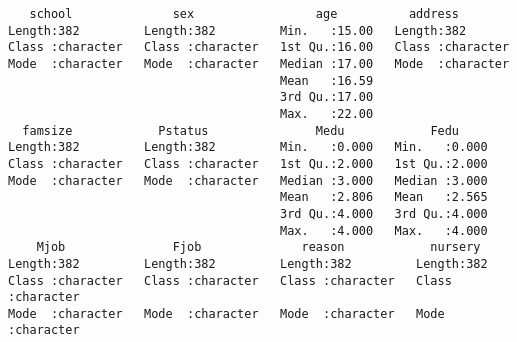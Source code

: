\documentclass[12pt]{abntex2}
\begin{document}
\begin{verbatim}
   school              sex                 age          address         
Length:382         Length:382         Min.   :15.00   Length:382        
Class :character   Class :character   1st Qu.:16.00   Class :character  
Mode  :character   Mode  :character   Median :17.00   Mode  :character  
                                      Mean   :16.59                     
                                      3rd Qu.:17.00                     
                                      Max.   :22.00                     
  famsize            Pstatus               Medu            Fedu      
Length:382         Length:382         Min.   :0.000   Min.   :0.000  
Class :character   Class :character   1st Qu.:2.000   1st Qu.:2.000  
Mode  :character   Mode  :character   Median :3.000   Median :3.000  
                                      Mean   :2.806   Mean   :2.565  
                                      3rd Qu.:4.000   3rd Qu.:4.000  
                                      Max.   :4.000   Max.   :4.000  
    Mjob               Fjob              reason            nursery         
Length:382         Length:382         Length:382         Length:382        
Class :character   Class :character   Class :character   Class :character  
Mode  :character   Mode  :character   Mode  :character   Mode  :character  




\end{verbatim}
\end{document}
